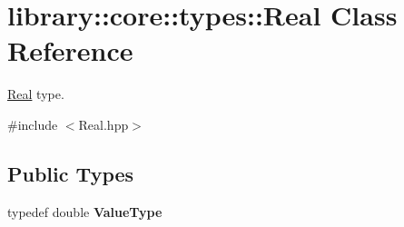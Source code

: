 \hypertarget{classlibrary_1_1core_1_1types_1_1_real}{}\section{library\+:\+:core\+:\+:types\+:\+:Real Class Reference}
\label{classlibrary_1_1core_1_1types_1_1_real}


\hyperlink{classlibrary_1_1core_1_1types_1_1_real}{Real} type.  




{\ttfamily \#include $<$Real.\+hpp$>$}

\subsection*{Public Types}
\begin{DoxyCompactItemize}
\item 
\mbox{\label{classlibrary_1_1core_1_1types_1_1_real_a9c5c8826b7e5a8e39544d23fea6c0e1c}} 
typedef double {\bfseries Value\+Type}
\end{DoxyCompactItemize}
